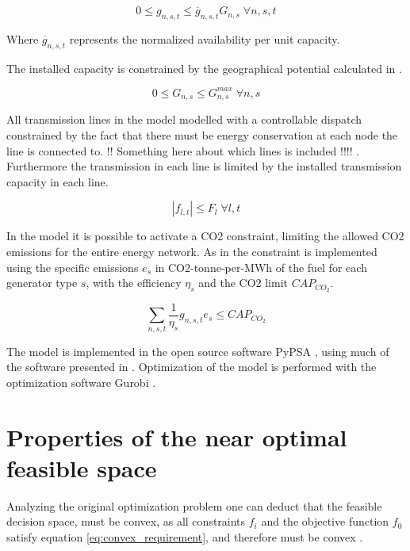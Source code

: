 \begin{equation}
0 \leq g_{n,s,t} \leq \overline{g}_{n,s,t} G_{n,s} \; \forall n,s,t
\end{equation}

Where $\overline{g}_{n,s,t}$ represents the normalized availability per unit capacity. 

The installed capacity is constrained by the geographical potential calculated in \cite{PypsaModel}.

\begin{equation}
0 \leq G_{n,s} \leq G_{n,s}^{max} \; \forall n,s
\end{equation}

All transmission lines in the model modelled with a controllable dispatch constrained by the fact that there must be energy conservation at each node the line is connected to. !! Something here about which lines is included !!!! . Furthermore the transmission in each line is limited by the installed transmission capacity in each line. 

\begin{equation}
|f_{l,t}| \leq F_l \; \forall l,t
\end{equation}

In the model it is possible to activate a CO2 constraint, limiting the allowed CO2 emissions for the entire energy network. As in \cite{PypsaModel} the constraint is implemented using the specific emissions $e_s$ in CO2-tonne-per-MWh of the fuel for each generator type $s$, with the efficiency $\eta_s$ and the CO2 limit $CAP_{CO_2}$. 

\begin{equation}
\sum_{n,s,t} \frac{1}{\eta_s}g_{n,s,t} e_s \leq CAP_{CO_2}
\end{equation}

The model is implemented in the open source software PyPSA \cite{Pypsa}, using much of the software presented in \cite{PypsaModel}. Optimization of the model is performed with the optimization software Gurobi \cite{Gurobi}. 

\section{Properties of the near optimal feasible space}\label{sec:properties_of_hull}

Analyzing the original optimization problem one can deduct that the feasible decision space, must be convex, as all constraints $f_i$ and the objective function $f_0$ satisfy equation \vref{eq:convex_requirement}, and therefore must be convex \cite{ConvexOpimization}. 

